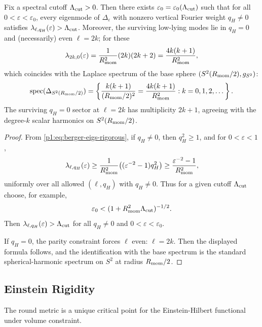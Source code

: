 \documentclass[11pt]{article}
\begin{document}
\begin{corollary}\label{p1:cor:berger-decoupling}
Fix a spectral cutoff \(\Lambda_{\mathrm{cut}}>0\). Then there exists \(\varepsilon_0=\varepsilon_0(\Lambda_{\mathrm{cut}})\) such that for all
\(0<\varepsilon<\varepsilon_0\), every eigenmode of \(\Delta_\varepsilon\) with nonzero vertical Fourier weight \(q_H\neq 0\) satisfies
\(\lambda_{\ell,q_H}(\varepsilon)>\Lambda_{\mathrm{cut}}\).
Moreover, the surviving low-lying modes lie in \(q_H=0\) and (necessarily) even \(\ell=2k\); for these
\[
\lambda_{2k,0}(\varepsilon)=\frac{1}{R_{\mathrm{mom}}^2}(2k)(2k+2)=\frac{4k(k+1)}{R_{\mathrm{mom}}^2},
\]
which coincides with the Laplace spectrum of the base sphere $(S^2(R_{\mathrm{mom}}/2),g_{S^2})$:
\[
\operatorname{spec}(\Delta_{S^2(R_{\mathrm{mom}}/2)})=\left\{\frac{k(k+1)}{(R_{\mathrm{mom}}/2)^2}=\frac{4k(k+1)}{R_{\mathrm{mom}}^2}:k=0,1,2,\dots\right\}.
\]
The surviving $q_H=0$ sector at $\ell=2k$ has multiplicity $2k+1$, agreeing with the degree-$k$ scalar harmonics on $S^2(R_{\mathrm{mom}}/2)$.
\end{corollary}

\begin{proof}
From \eqref{p1:eq:berger-eigs-rigorous}, if \(q_H\neq0\), then \(q_H^2\ge1\), and
for \(0<\varepsilon<1\),
\[
\lambda_{\ell,q_H}(\varepsilon)
\ge \frac{1}{R_{\mathrm{mom}}^2}\big((\varepsilon^{-2}-1)q_H^2\big)
\ge \frac{\varepsilon^{-2}-1}{R_{\mathrm{mom}}^2},
\]
uniformly over all allowed \((\ell,q_H)\) with \(q_H\neq0\). Thus for a given cutoff
\(\Lambda_{\mathrm{cut}}\) choose, for example,
\[
\varepsilon_0 < (1+R_{\mathrm{mom}}^2\Lambda_{\mathrm{cut}})^{-1/2}.
\]
Then \(\lambda_{\ell,q_H}(\varepsilon)>\Lambda_{\mathrm{cut}}\) for all \(q_H\neq0\) and
\(0<\varepsilon<\varepsilon_0\).

If $q_H=0$, the parity constraint forces $\ell$ even: $\ell=2k$. Then the displayed formula follows, and the
identification with the base spectrum is the standard spherical-harmonic spectrum on $S^2$ at radius $R_{\mathrm{mom}}/2$.
\end{proof}


\subsection{Einstein Rigidity}

The round metric is a unique critical point for the Einstein-Hilbert functional under volume constraint.
\end{document}
